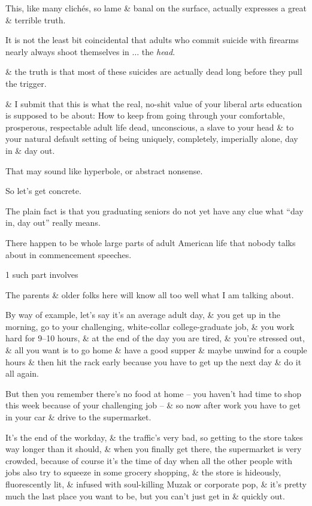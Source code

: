 \documentclass{article}
\numberwithin{equation}{section}
\begin{document}
This, like many clich\'es, so lame \& banal on the surface, actually expresses a great \& terrible truth.

It is not the least bit coincidental that adults who commit suicide with firearms nearly always shoot themselves in $\ldots$ the \textit{head}.

\& the truth is that most of these suicides are actually dead long before they pull the trigger.

\& I submit that this is what the real, no-shit value of your liberal arts education is supposed to be about: How to keep from going through your comfortable, prosperous, respectable adult life dead, unconscious, a slave to your head \& to your natural default setting of being uniquely, completely, imperially alone, day in \& day out.

That may sound like hyperbole, or abstract nonsense.

So let's get concrete.

The plain fact is that you graduating seniors do not yet have any clue what ``day in, day out'' really means.

There happen to be whole large parts of adult American life that nobody talks about in commencement speeches.

1 such part involves 

The parents \& older folks here will know all too well what I am talking about.

By way of example, let's say it's an average adult day, \& you get up in the morning, go to your challenging, white-collar college-graduate job, \& you work hard for 9--10 hours, \& at the end of the day you are tired, \& you're stressed out, \& all you want is to go home \& have a good supper \& maybe unwind for a couple hours \& then hit the rack early because you have to get up the next day \& do it all again.

But then you remember there's no food at home -- you haven't had time to shop this week because of your challenging job -- \& so now after work you have to get in your car \& drive to the supermarket.

It's the end of the workday, \& the traffic's very bad, so getting to the store takes way longer than it should, \& when you finally get there, the supermarket is very crowded, because of course it's the time of day when all the other people with jobs also try to squeeze in some grocery shopping, \& the store is hideously, fluorescently lit, \& infused with soul-killing Muzak or corporate pop, \& it's pretty much the last place you want to be, but you can't just get in \& quickly out.
\end{document}
